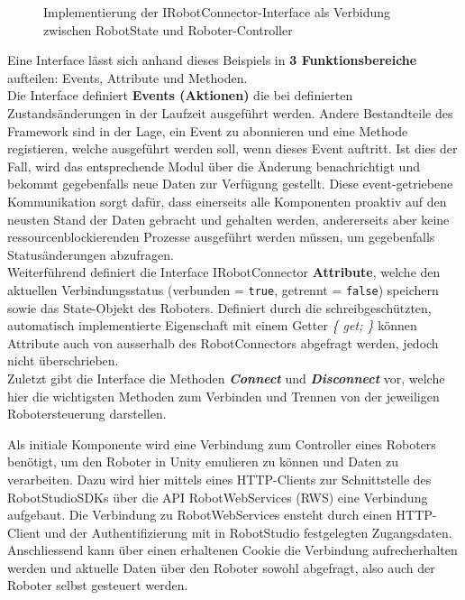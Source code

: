 \begin{figure}[H]
	\inputminted[fontsize=\footnotesize]{csharp}{code-snippets/IRobotConnector.cs}
	\caption{Implementierung der IRobotConnector-Interface als Verbidung zwischen
		RobotState und Roboter-Controller}
\end{figure}
\noindent
Eine Interface lässt sich anhand dieses Beispiels in \textbf{3
	Funktionsbereiche} aufteilen: Events, Attribute und Methoden.\\

\noindent
Die Interface definiert \textbf{Events (Aktionen)} die bei definierten Zustandsänderungen
in der Laufzeit ausgeführt werden. Andere Bestandteile des Framework sind in der
Lage, ein Event zu abonnieren und eine Methode registieren, welche ausgeführt
werden soll, wenn dieses Event auftritt. Ist dies der Fall, wird das
entsprechende Modul über die Änderung benachrichtigt und bekommt gegebenfalls
neue Daten zur Verfügung gestellt. Diese event-getriebene Kommunikation sorgt
dafür, dass einerseits alle Komponenten proaktiv auf den neusten Stand der Daten gebracht
und gehalten werden, andererseits aber keine ressourcenblockierenden Prozesse
ausgeführt werden müssen, um gegebenfalls Statusänderungen abzufragen.\\

\noindent
Weiterführend definiert die Interface IRobotConnector \textbf{Attribute}, welche den
aktuellen Verbindungsstatus (verbunden = \texttt{true}, getrennt = \texttt{false}) speichern sowie das
State-Objekt des Roboters. Definiert durch die schreibgeschützten, automatisch
implementierte Eigenschaft mit einem Getter \textit{\{ get; \}} können Attribute
auch von ausserhalb des RobotConnectors abgefragt werden, jedoch nicht
überschrieben.\\

\noindent
Zuletzt gibt die Interface die Methoden \textit{\textbf{Connect}} und \textit{\textbf{Disconnect}}
vor, welche hier die wichtigsten Methoden zum Verbinden und
Trennen von der jeweiligen Robotersteuerung darstellen.

Als initiale Komponente wird eine Verbindung zum
Controller eines Roboters benötigt, um den Roboter in Unity emulieren zu können
und Daten zu verarbeiten. Dazu wird hier mittels eines HTTP-Clients zur
Schnittstelle des RobotStudioSDKs über die API RobotWebServices (RWS) eine
Verbindung aufgebaut. Die Verbindung zu RobotWebServices ensteht durch einen
HTTP-Client und der Authentifizierung mit in RobotStudio festgelegten
Zugangsdaten. Anschliessend kann über einen erhaltenen Cookie die Verbindung
aufrecherhalten werden und aktuelle Daten über den Roboter sowohl abgefragt,
also auch der Roboter selbst gesteuert werden.

